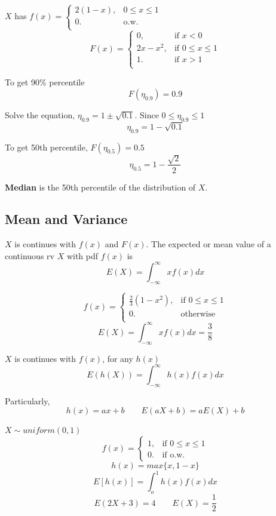 \begin{exmp}
$X$ has $f(x)=\begin{cases}
2(1-x), & 0\leq x\leq 1\\
0.		&\text{o.w.}\\
\end{cases}$
\[F(x)=\begin{cases}
0,		&\text{if } x<0\\
2x-x^2, &\text{if } 0\leq x\leq 1\\
1.		&\text{if  }x>1\\
\end{cases}\]

To get 90\% percentile
\[F(\eta_{0.9})=0.9\]

Solve the equation, $\eta_{0.9}=1 \pm \sqrt{0.1}$. Since $0 \leq \eta_{0.9} \leq 1$
\[\eta_{0.9}=1 - \sqrt{0.1}\]

To get 50th percentile, $F(\eta_{0.5})=0.5$
\[\eta_{0.5}=1-\frac{\sqrt{2}}{2}\]
\end{exmp}

\textbf{Median} is the 50th percentile of the distribution of $X$.

\subsection{Mean and Variance}
\begin{defn}
$X$ is continues with $f(x)$ and $F(x)$. The expected or mean value of a continuous rv $X$ with pdf $f(x)$ is
\[E(X)=\int_{-\infty}^{\infty}xf(x)dx \]
\end{defn}

\begin{exmp}
\[f(x)=\begin{cases}
\frac{2}{3}(1-x^2), &\text{if } 0\leq x\leq 1\\
0.		&\text{otherwise}\\
\end{cases}\]
\[E(X)=\int_{-\infty}^{\infty}xf(x)dx=\frac{3}{8} \]
\end{exmp}

\begin{prop}
$X$ is continues with $f(x)$, for any $h(x)$
\[E(h(X))=\int_{-\infty}^{\infty}h(x)f(x)dx\]

Particularly,
\[h(x)=ax+b \qquad E(aX+b)=aE(X)+b\]
\end{prop}

\begin{exmp}
$X \sim uniform(0,1)$
\[f(x)=\begin{cases}
1, &\text{if } 0 \leq x\leq 1\\
0. & \text{if o.w.}
\end{cases}\]
\[h(x)=max\{x,1-x\}\]
\[E[h(x)]=\int_o^1 h(x)f(x)dx\]
\[E(2X+3)=4 \qquad E(X)=\frac{1}{2}\]
\end{exmp}

